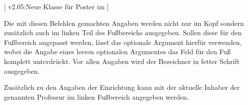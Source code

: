 \begin{DeclareEntity}{}[%
  v2.05:Neue Klasse für Poster im \TUDCD%
]
\begin{Declaration}
  {}
\begin{Declaration}
  {}
\begin{Declaration}
  {}
\begin{Declaration}
  {}
\printdeclarationlist
%
Die mit diesen Befehlen gemachten Angaben werden nicht nur im Kopf sondern 
zusätzlich auch im linken Teil des Fußbereichs ausgegeben. Sollen diese für den 
Fußbereich angepasst werden, lässt das optionale Argument hierfür verwenden, 
wobei die Angabe eines leeren optionalen Argumentes das Feld für den Fuß 
komplett unterdrückt. Vor allen Angaben wird der Bezeichner  
in fetter Schrift ausgegeben.
\end{Declaration}
\end{Declaration}
\end{Declaration}
\end{Declaration}


\begin{Declaration}
  {}
\printdeclarationlist
%
Zusätzlich zu den Angaben der Einrichtung kann mit  der 
aktuelle Inhaber der genannten Professur im linken Fußbereich angegeben werden.
\end{Declaration}


\end{DeclareEntity}
